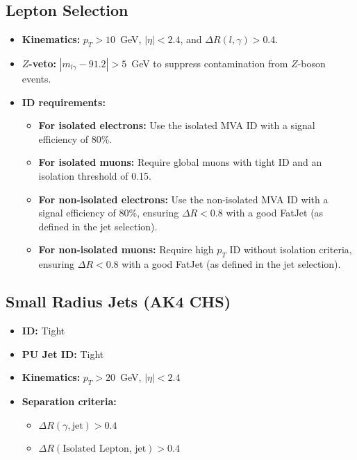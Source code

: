\subsection*{Lepton Selection}
\begin{itemize}
    \item \textbf{Kinematics:} \(p_T > 10\)~GeV, \(|\eta| < 2.4\), and \(\Delta R(l, \gamma) > 0.4\).
    \item \textbf{\(Z\)-veto:} \(|m_{l\gamma} - 91.2| > 5\)~GeV to suppress contamination from \(Z\)-boson events.
    \item \textbf{ID requirements:}
        \begin{itemize}
            \item \textbf{For isolated electrons:} Use the isolated MVA ID with a signal efficiency of 80\%.
            \item \textbf{For isolated muons:} Require global muons with tight ID and an isolation threshold of 0.15.
            \item \textbf{For non-isolated electrons:} Use the non-isolated MVA ID with a signal efficiency of 80\%, ensuring \(\Delta R < 0.8\) with a good FatJet (as defined in the jet selection).
            \item \textbf{For non-isolated muons:} Require high \(p_T\) ID without isolation criteria, ensuring \(\Delta R < 0.8\) with a good FatJet (as defined in the jet selection).
        \end{itemize}
\end{itemize}

\subsection*{Small Radius Jets (AK4 CHS)}
\begin{itemize}
    \item \textbf{ID:} Tight
    \item \textbf{PU Jet ID:} Tight
    \item \textbf{Kinematics:} \(p_T > 20\)~GeV, \(|\eta| < 2.4\)
    \item \textbf{Separation criteria:}
        \begin{itemize}
            \item \(\Delta R(\gamma, \text{jet}) > 0.4\)
            \item \(\Delta R(\text{Isolated Lepton, jet}) > 0.4\)
        \end{itemize}
\end{itemize}

